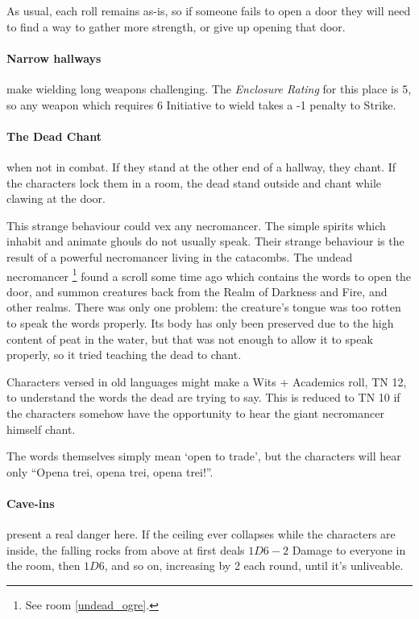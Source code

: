 \begin{multicols}{2}
As usual, each roll remains as-is, so if someone fails to open a door they will need to find a way to gather more strength, or give up opening that door.

\paragraph{Narrow hallways}
make wielding long weapons challenging.
The \textit{Enclosure Rating} for this place is 5, so any weapon which requires 6 Initiative to wield takes a -1 penalty to Strike.

\paragraph{The Dead Chant} when not in combat.
If they stand at the other end of a hallway, they chant.
If the characters lock them in a room, the dead stand outside and chant while clawing at the door.

This strange behaviour could vex any necromancer.
The simple spirits which inhabit and animate ghouls do not usually speak.
Their strange behaviour is the result of a powerful necromancer living in the catacombs.
The undead necromancer%
\footnote{See room \ref{undead_ogre}.}
found a scroll some time ago which contains the words to open the door, and summon creatures back from the Realm of Darkness and Fire, and other realms.
There was only one problem: the creature's tongue was too rotten to speak the words properly.
Its body has only been preserved due to the high content of peat in the water, but that was not enough to allow it to speak properly, so it tried teaching the dead to chant.

Characters versed in old languages might make a Wits + Academics roll, TN 12, to understand the words the dead are trying to say.  This is reduced to TN 10 if the characters somehow have the opportunity to hear the giant necromancer himself chant.

The words themselves simply mean `open to trade', but the characters will hear only ``Opena trei, opena trei, opena trei!''.

\paragraph{Cave-ins} present a real danger here.  If the ceiling ever collapses while the characters are inside, the falling rocks from above at first deals $1D6-2$ Damage to everyone in the room, then $1D6$, and so on, increasing by 2 each round, until it's unliveable.


\end{multicols}
